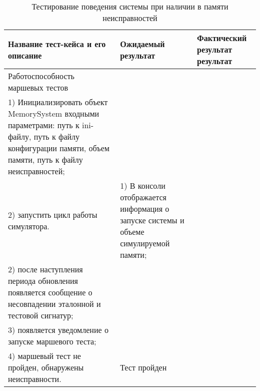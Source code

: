 \begin{longtable}[p]{| >{\raggedright}p{}                     
                     | >{\raggedright}p{}
                     | >{\raggedright\arraybackslash}p{}|}
  \caption{Тестирование поведения системы при наличии в памяти неисправностей}
  \label{sec:testing:march_testing} \tabularnewline

  \hline
      Название тест-кейса и его описание & Ожидаемый результат & Фактический результат результат \\
   \hline
   Работоспособность маршевых тестов\\ 
   1) Инициализировать объект MemorySystem входными параметрами: путь к ini-файлу, путь к файлу конфигурации памяти, объем памяти, путь к файлу неисправностей; \\
   2) запустить цикл работы симулятора.

   &
   1) В консоли отображается информация о запуске системы и объеме симулируемой памяти;\\
   2) после наступления периода обновления появляется сообщение о несовпадении эталонной и тестовой сигнатур;\\
   3) появляется уведомление о запуске маршевого теста;\\
   4) маршевый тест не пройден, обнаружены неисправности.

   &
   Тест пройден \\
   \hline
\end{longtable}





